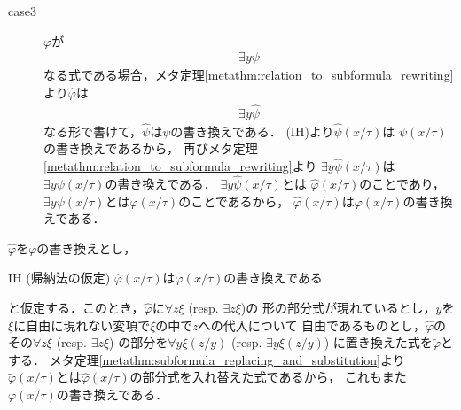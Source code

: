\begin{metaprf}[第一]
\begin{description}
\begin{description}
					\item[case3] $\varphi$が
						\begin{align}
							\exists y \psi
						\end{align}
						なる式である場合，メタ定理\ref{metathm:relation_to_subformula_rewriting}より$\widehat{\varphi}$は
						\begin{align}
							\exists y \widehat{\psi}
						\end{align}
						なる形で書けて，$\widehat{\psi}$は$\psi$の書き換えである．
						(IH)より$\widehat{\psi}(x/\tau)$は
						$\psi(x/\tau)$の書き換えであるから，
						再びメタ定理\ref{metathm:relation_to_subformula_rewriting}より
						$\exists y \widehat{\psi}(x/\tau)$は
						$\exists y \psi(x/\tau)$の書き換えである．
						$\exists y \widehat{\psi}(x/\tau)$とは
						$\widehat{\varphi}(x/\tau)$のことであり，
						$\exists y \psi(x/\tau)$とは$\varphi(x/\tau)$のことであるから，
						$\widehat{\varphi}(x/\tau)$は$\varphi(x/\tau)$の書き換えである．
						\QED
				\end{description}
		\end{description}
	\end{metaprf}
	
	\begin{metaprf}[第二]
		$\widehat{\varphi}$を$\varphi$の書き換えとし，
		\begin{itembox}[l]{IH (帰納法の仮定)}
			$\widehat{\varphi}(x/\tau)$は$\varphi(x/\tau)$の書き換えである
		\end{itembox}
		と仮定する．このとき，$\widehat{\varphi}$に$\forall z \xi$ (resp. $\exists z \xi$)の
		形の部分式が現れているとし，$y$を$\xi$に自由に現れない変項で$\xi$の中で$z$への代入について
		自由であるものとし，$\widehat{\varphi}$のその$\forall z \xi$ (resp. $\exists z \xi$)
		の部分を$\forall y \xi(z/y)$ (resp. $\exists y \xi(z/y)$)
		に置き換えた式を$\widetilde{\varphi}$とする．
		メタ定理\ref{metathm:subformula_replacing_and_substitution}より
		$\widetilde{\varphi}(x/\tau)$とは$\widehat{\varphi}(x/\tau)$の部分式を入れ替えた式であるから，
		これもまた$\varphi(x/\tau)$の書き換えである．
		\QED
	\end{metaprf}